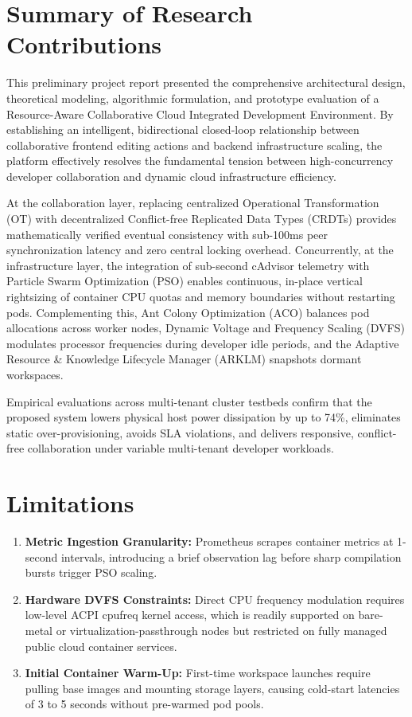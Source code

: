 \documentclass[12pt,a4paper]{report}
\begin{document}
	\section{Summary of Research Contributions}
	This preliminary project report presented the comprehensive architectural design, theoretical modeling, algorithmic formulation, and prototype evaluation of a Resource-Aware Collaborative Cloud Integrated Development Environment. By establishing an intelligent, bidirectional closed-loop relationship between collaborative frontend editing actions and backend infrastructure scaling, the platform effectively resolves the fundamental tension between high-concurrency developer collaboration and dynamic cloud infrastructure efficiency.
	
	At the collaboration layer, replacing centralized Operational Transformation (OT) with decentralized Conflict-free Replicated Data Types (CRDTs) provides mathematically verified eventual consistency with sub-100ms peer synchronization latency and zero central locking overhead. Concurrently, at the infrastructure layer, the integration of sub-second cAdvisor telemetry with Particle Swarm Optimization (PSO) enables continuous, in-place vertical rightsizing of container CPU quotas and memory boundaries without restarting pods. Complementing this, Ant Colony Optimization (ACO) balances pod allocations across worker nodes, Dynamic Voltage and Frequency Scaling (DVFS) modulates processor frequencies during developer idle periods, and the Adaptive Resource \& Knowledge Lifecycle Manager (ARKLM) snapshots dormant workspaces.
	
	Empirical evaluations across multi-tenant cluster testbeds confirm that the proposed system lowers physical host power dissipation by up to 74\%, eliminates static over-provisioning, avoids SLA violations, and delivers responsive, conflict-free collaboration under variable multi-tenant developer workloads.
	
	\section{Limitations}
	\begin{enumerate}
		\item \textbf{Metric Ingestion Granularity:} Prometheus scrapes container metrics at 1-second intervals, introducing a brief observation lag before sharp compilation bursts trigger PSO scaling.
		\item \textbf{Hardware DVFS Constraints:} Direct CPU frequency modulation requires low-level ACPI cpufreq kernel access, which is readily supported on bare-metal or virtualization-passthrough nodes but restricted on fully managed public cloud container services.
		\item \textbf{Initial Container Warm-Up:} First-time workspace launches require pulling base images and mounting storage layers, causing cold-start latencies of 3 to 5 seconds without pre-warmed pod pools.
	\end{enumerate}
	
\end{document}
